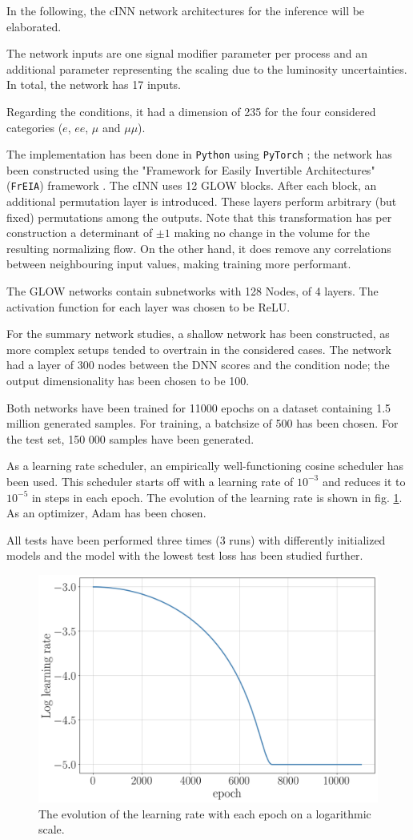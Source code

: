 
In the following, the cINN network architectures for the inference will be elaborated.

The network inputs are one signal modifier parameter per process and an additional parameter representing the scaling due to the luminosity uncertainties. In total, the network has 17 inputs.

Regarding the conditions, it had a dimension of 235 for the four considered categories ($e$, $ee$, $\mu$ and $\mu\mu$).

The implementation has been done in \texttt{Python} using \texttt{PyTorch} \cite{pytorch}; the network has been constructed using the "Framework for Easily Invertible Architectures" (\texttt{FrEIA}) framework \cite{freia}. The cINN uses 12 GLOW blocks. After each block, an additional permutation layer is introduced. These layers perform arbitrary (but fixed) permutations among the outputs. Note that this transformation has per construction a determinant of $\pm1$ making no change in the volume for the resulting normalizing flow. On the other hand, it does remove any correlations between neighbouring input values, making training more performant.

The GLOW networks contain subnetworks with 128 Nodes, of 4 layers. The activation function for each layer was chosen to be ReLU.

For the summary network studies, a shallow network has been constructed, as more complex setups tended to overtrain in the considered cases. The network had a layer of 300 nodes between the DNN scores and the condition node; the output dimensionality has been chosen to be 100.

Both networks have been trained for 11000 epochs on a dataset containing 1.5 million generated samples. For training, a batchsize of 500 has been chosen. For the test set, 150 000 samples have been generated.

As a learning rate scheduler, an empirically well-functioning cosine scheduler has been used. This scheduler starts off with a learning rate of $10^{-3}$ and reduces it to $10^{-5}$ in steps in each epoch. The evolution of the learning rate is shown in fig. \ref{fig:lr}. As an optimizer, Adam has been chosen.

All tests have been performed three times (3 runs) with differently initialized models and the model with the lowest test loss has been studied further.

\begin{figure}[h!]
	\centering
	\includegraphics[width=0.6\linewidth]{figures/network_setup/lr}
	\caption{The evolution of the learning rate with each epoch on a logarithmic scale.}
	\label{fig:lr}
\end{figure}
